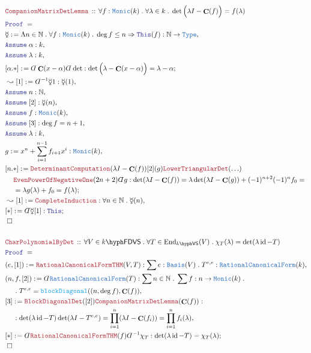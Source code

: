 \documentclass[12pt]{scrartcl}%
\newcommand{\TYPE}[1]{\textcolor{NavyBlue}{\mathtt{#1}}}%
\newcommand{\FUNC}[1]{\textcolor{Cerulean}{\mathtt{#1}}}%
\newcommand{\LOGIC}[1]{\textcolor{Blue}{\mathtt{#1}}}%
\newcommand{\THM}[1]{\textcolor{Maroon}{\mathtt{#1}}}%
\renewcommand{\.}{\; . \;} %
\newcommand{\de}{: \kern 0.1pc =} %
\newcommand{\Theorem}[2]{& \THM{#1} \, :: \, #2 \\ & \Proof = \\ } %
\newcommand{\NewLine}{\\ & \kern 1pc}%
\newcommand{\Page}[1]{ \begin{align*} #1 \end{align*}  }%
\newcommand{ \bd }{ \ByDef }%
\newcommand{\Type}{\TYPE{Type}}%
\newcommand{\Nat}{\mathbb{N}}%
\DeclareMathOperator*{\id}{id}%
\newcommand{\End}{\mathrm{End}}%
\newcommand{\Say}[3]{& #1 \de #2 : #3, \\} %
\newcommand{\Conclude}[3]{& #1 \de #2 : #3; \\}%
\newcommand{\Derive}[3]{& \leadsto #1 \de #2 : #3, \\} %
\newcommand{\Assume}[2]{& \LOGIC{Assume} \; #1 : #2, \\} %
\newcommand{\QED}{\; \square} %
\newcommand{\EndProof}{& \QED \\} %
\newcommand{\ByDef}{\rotatebox[origin=c]{-180}{$D$}}%
\newcommand{\Proof}{\LOGIC{Proof} \; } %
\newcommand{\RCF}{\TYPE{RationalCanonicalForm}}
\DeclareMathOperator{\Cell}{\mathbf{C}} %
\newcommand{\VS}[1]{#1\hyph\mathsf{VS}} %
\newcommand{\FDVS}[1]{#1\hyph\mathsf{FDVS}} %
\begin{document}
\Page{
	\Theorem{CompanionMatrixDetLemma}{ \forall f : \TYPE{Monic}(k)  \. \forall \lambda \in k \. \det \Big(\lambda I -  \Cell(f)\Big) = f(\lambda)   }
	\Say{\mercury}{\Lambda n \in \Nat \. \forall f : \TYPE{Monic}(k) \.  \deg f \le n \Rightarrow \LOGIC{This}(f)}{\Nat \to \Type}
	\Assume{\alpha}{k}
	\Assume{\lambda}{k}
	\Conclude{[\alpha.*]}{ \bd \Cell(x - \alpha) \bd \det  }{ \det \Big( \lambda  - \Cell(x  - \alpha)  \Big)  = \lambda - \alpha   }
	\Derive{[1]}{\bd^{-1}\mercury{1}}{\mercury(1)}
	\Assume{n}{\Nat}
	\Assume{[2]}{\mercury(n)}
	\Assume{f}{\TYPE{Monic}(k)}
	\Assume{[3]}{  \deg f = n + 1 }
	\Assume{\lambda}{k}
	\Say{g}{x^n + \sum^{n-1}_{i=1} f_{i+1} x^i}{\TYPE{Monic}(k)}
	\Conclude{[n.*]}{ \THM{DeterminantComputation}(\lambda I - \Cell(f))[2](g)\THM{LowerTriangularDet}(\ldots) \NewLine  \THM{EvenPowerOfNegativeOne}(2n+2) \bd g}
	{  \det(\lambda I  - \Cell(f) ) = \lambda\det (\lambda I - \Cell(g))  + (-1)^{n + 2} (-1)^{n} f_0 = \NewLine = \lambda g(\lambda) + f_0 = f(\lambda)   }
	\Derive{[1]}{\THM{CompleteInduction}}{\forall n \in \Nat \. \mercury(n)}
	\Conclude{[*]}{\bd \mercury [1]}{\LOGIC{This}}
	\EndProof
	\\
	\Theorem{CharPolynomialByDet}{\forall V \in \FDVS{k} \. \forall T \in \End_{\VS{k}}(V) \.  \chi_T(\lambda) = \det(\lambda \id - T )   }
	\Say{(e,[1])}{\THM{RationalCanonicalFormTHM}(V,T)}{ \sum e : \TYPE{Basis}(V) \. T^{e,e} : \RCF(k)   }
	\Say{(n,f,[2])}{\bd \RCF(T)}{ \sum n \in \Nat \. \sum f : n \to \TYPE{Monic}(k) \. \NewLine \. T^{e,e} = \FUNC{blockDiagonal}((n,\deg f),\Cell(f))  }
	\Say{[3]}{\THM{BlockDiagonalDet}([2])\THM{CompanionMatrixDetLemma}(\Cell(f))}
	{  \NewLine : \det(\lambda \id - T)\det (\lambda I - T^{e,e}) = \prod^n_{i=1} (\lambda I - \Cell(f_i)) = \prod^n_{i=1}f_i(\lambda)   }
	\Conclude{[*]}{ \bd \THM{RationalCanonicalFormTHM}(f)\bd^{-1} \chi_T}{ \det(\lambda \id - T ) = \chi_T(\lambda) }
	\EndProof
}
\newpage
\end{document}
